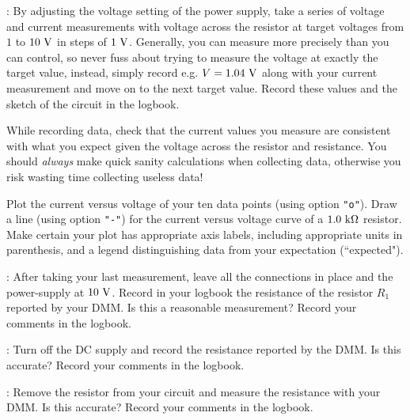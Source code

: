 \begin{measurement}: By adjusting the voltage setting of the power supply, take a series of voltage and current measurements with voltage across the resistor at target voltages from $1$ to $10~\rm V$ in steps of $1~\rm V$. Generally, you can measure more precisely than you can control, so
never fuss about trying to measure the voltage at exactly the target value, instead, simply record e.g. $V=1.04~\rm V$ along with your
current measurement and move on to the next target value. Record these values and the sketch of the circuit in the logbook. \end{measurement}

While recording data, check that the current values you measure are
consistent with what you expect given the voltage across the resistor
and resistance.  You should {\em always} make quick sanity
calculations when collecting data, otherwise you risk wasting time
collecting useless data!

\begin{plot} Plot the current versus voltage of your ten data points
(using option {\tt "o"}).  Draw a line (using option {\tt "-"}) for
the current versus voltage curve of a $1.0~\rm k\Omega$ resistor.
Make certain your plot has appropriate axis labels, including
appropriate units in parenthesis, and a legend distinguishing data
from your expectation (``expected").  \end{plot}

\begin{measurement}: After taking your last measurement, leave all the
connections in place and the power-supply at $10~\rm V$.  Record in
your logbook the resistance of the resistor $R_1$ reported by your
DMM.  Is this a reasonable measurement? Record your comments in the logbook. \end{measurement}

 \begin{measurement}: Turn off
the DC supply and record the resistance reported by the DMM.  Is this
accurate? Record your comments in the logbook.  \end{measurement}
\begin{measurement}: Remove the resistor from your circuit
and measure the resistance with your DMM.  Is this accurate? Record your comments in the logbook. \end{measurement}

